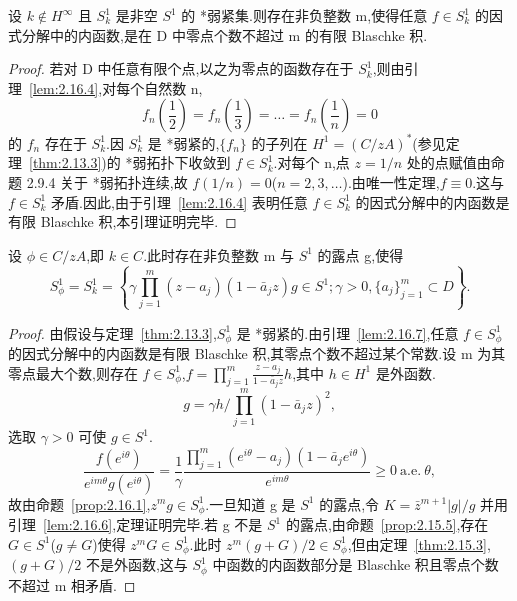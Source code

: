 \begin{lemma}\label{lem:2.16.7}
设 $k \notin H^{\infty}$ 且 $S_{k}^{1}$ 是非空 $S^{1}$ 的 *弱紧集.则存在非负整数 m,使得任意 $f \in S_{k}^{1}$ 的因式分解中的内函数,是在 D 中零点个数不超过 m 的有限 Blaschke 积.
\end{lemma}

\begin{proof}
若对 D 中任意有限个点,以之为零点的函数存在于 $S_{k}^{1}$,则由引理~\ref{lem:2.16.4},对每个自然数 n,
\begin{equation*}
f_{n}\left(\frac{1}{2}\right) = f_{n}\left(\frac{1}{3}\right) = \dots = f_{n}\left(\frac{1}{n}\right) = 0
\end{equation*}
的 $f_{n}$ 存在于 $S_{k}^{1}$.因 $S_{k}^{1}$ 是 *弱紧的,$\{f_{n}\}$ 的子列在 $H^{1} = (C/zA)^{*}$(参见定理~\ref{thm:2.13.3})的 *弱拓扑下收敛到 $f \in S_{k}^{1}$.对每个 n,点 $z = 1/n$ 处的点赋值由命题 2.9.4 关于 *弱拓扑连续,故 $f(1/n) = 0$($n = 2, 3, \ldots$).由唯一性定理,$f \equiv 0$.这与 $f \in S_{k}^{1}$ 矛盾.因此,由于引理~\ref{lem:2.16.4} 表明任意 $f \in S_{k}^{1}$ 的因式分解中的内函数是有限 Blaschke 积,本引理证明完毕.
\end{proof}

\begin{theorem}\label{thm:2.16.8}
设 $\phi \in C/zA$,即 $k \in C$.此时存在非负整数 m 与 $S^{1}$ 的露点 g,使得
\begin{equation*}
S_{\phi}^{1} = S_{k}^{1} = \left\{\gamma \prod_{j=1}^{m} (z - a_{j})(1 - \bar{a}_{j}z) g \in S^{1}; \gamma > 0, \{a_{j}\}_{j=1}^{m} \subset D \right\}.
\end{equation*}
\end{theorem}

\begin{proof}
由假设与定理~\ref{thm:2.13.3},$S_{\phi}^{1}$ 是 *弱紧的.由引理~\ref{lem:2.16.7},任意 $f \in S_{\phi}^{1}$ 的因式分解中的内函数是有限 Blaschke 积,其零点个数不超过某个常数.设 m 为其零点最大个数,则存在 $f \in S_{\phi}^{1}$,$f = \prod_{j=1}^{m} \frac{z - a_{j}}{1 - \bar{a}_{j}z} h$,其中 $h \in H^{1}$ 是外函数.
\begin{equation*}
g = \gamma h / \prod_{j=1}^{m} (1 - \bar{a}_{j}z)^{2},
\end{equation*}
选取 $\gamma > 0$ 可使 $g \in S^{1}$.
\begin{equation*}
\frac{f(e^{i\theta})}{e^{im\theta}g(e^{i\theta})} = \frac{1}{\gamma}\frac{\prod_{j=1}^{m} (e^{i\theta} - a_{j})(1 - \bar{a}_{j}e^{i\theta})}{e^{im\theta}} \geq 0 \ \text{a.e.} \ \theta,
\end{equation*}
故由命题~\ref{prop:2.16.1},$z^{m}g \in S_{\phi}^{1}$.一旦知道 g 是 $S^{1}$ 的露点,令 $K = \bar{z}^{m+1}|g|/g$ 并用引理~\ref{lem:2.16.6},定理证明完毕.若 g 不是 $S^{1}$ 的露点,由命题~\ref{prop:2.15.5},存在 $G \in S^{1}$($g \neq G$)使得 $z^{m}G \in S_{\phi}^{1}$.此时 $z^{m}(g + G)/2 \in S_{\phi}^{1}$,但由定理~\ref{thm:2.15.3},$(g + G)/2$ 不是外函数,这与 $S_{\phi}^{1}$ 中函数的内函数部分是 Blaschke 积且零点个数不超过 m 相矛盾.
\end{proof}

